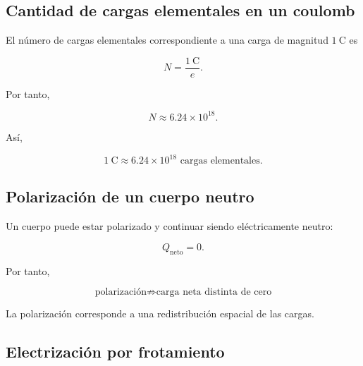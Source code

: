 
\subsection{Cantidad de cargas elementales en un coulomb}

El número de cargas elementales correspondiente a una carga de magnitud
\(\SI{1}{\coulomb}\) es

\begin{equation}
    N
    =
    \frac{\SI{1}{\coulomb}}{e}.
\end{equation}

Por tanto,

\begin{equation}
    \boxed{
    N\approx6.24\times10^{18}
    }.
\end{equation}

Así,

\begin{equation}
    \boxed{
    \SI{1}{\coulomb}
    \approx
    6.24\times10^{18}
    \text{ cargas elementales}
    }.
\end{equation}



\subsection{Polarización de un cuerpo neutro}

Un cuerpo puede estar polarizado y continuar siendo eléctricamente neutro:

\begin{equation}
    \boxed{
    Q_{\text{neto}}=0
    }.
\end{equation}

Por tanto,

\[
\boxed{
\text{polarización}
\not\Rightarrow
\text{carga neta distinta de cero}
}
\]

La polarización corresponde a una redistribución espacial de las cargas.



\subsection{Electrización por frotamiento}

